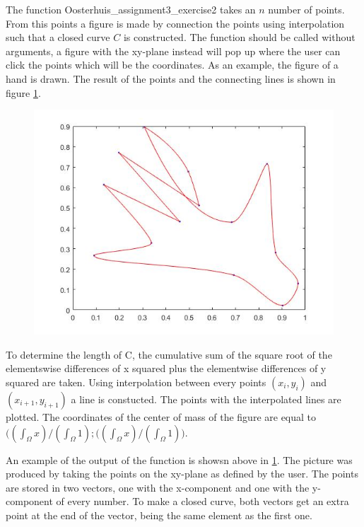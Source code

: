 \documentclass[12pt]{article}
\begin{document}
The function Oosterhuis\_assignment3\_exercise2 takes an $n$ number of points. From this points a figure is made by connection the points using interpolation such that a closed curve $C$ is constructed. The function should be called without arguments, a figure with the xy-plane instead will pop up where the user can click the points which will be the coordinates. As an example, the figure of a hand is drawn. The result of the points and the connecting lines is shown in figure \ref{ex2_1}.
\begin{figure}[H]
\centering
\includegraphics[width=0.6\linewidth,natwidth=610,natheight=642]{ex2_hand.jpg}
\caption{}
\label{ex2_1}
\end{figure}

To determine the length of C, the cumulative sum of the square root of the elementswise differences of x squared plus the elementwise differences of y squared are taken. Using interpolation between every points $(x_i,y_i)$ and  $(x_{i+1},y_{i+1})$ a line is constucted. The points with the interpolated lines are plotted. The coordinates of the center of mass of the figure are equal to $\bigl((\int_{\Omega}x) / (\int_{\Omega}1); ((\int_{\Omega}x) / (\int_{\Omega}1)\bigr)$.

An example of the output of the function is showsn above in \ref{ex2_1}. The picture was produced by taking the points on the xy-plane as defined by the user. The points are stored in two vectors, one with the x-component and one with the y-component of every number. To make a closed curve, both vectors get an extra point at the end of the vector, being the same element as the first one.
\end{document}
